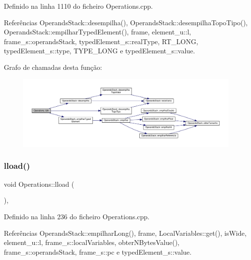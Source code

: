 Definido na linha 1110 do ficheiro Operations.\+cpp.



Referências Operands\+Stack\+::desempilha(), Operands\+Stack\+::desempilha\+Topo\+Tipo(), Operands\+Stack\+::empilhar\+Typed\+Element(), frame, element\+\_\+u\+::l, frame\+\_\+s\+::operands\+Stack, typed\+Element\+\_\+s\+::real\+Type, R\+T\+\_\+\+L\+O\+NG, typed\+Element\+\_\+s\+::type, T\+Y\+P\+E\+\_\+\+L\+O\+NG e typed\+Element\+\_\+s\+::value.

Grafo de chamadas desta função\+:\nopagebreak
\begin{figure}[H]
\begin{center}
\leavevmode
\includegraphics[width=350pt]{classOperations_ab9bb90a9db0433e1d04b0eb9bceea9f4_cgraph}
\end{center}
\end{figure}
\mbox{\label{classOperations_abd9d44b782cc5ae7d7985a424a0985c6}} 
\subsubsection{\texorpdfstring{lload()}{lload()}}
{\footnotesize\ttfamily void Operations\+::lload (\begin{DoxyParamCaption}{ }\end{DoxyParamCaption})\hspace{0.3cm}{\ttfamily [static]}, {\ttfamily [private]}}



Definido na linha 236 do ficheiro Operations.\+cpp.



Referências Operands\+Stack\+::empilhar\+Long(), frame, Local\+Variables\+::get(), is\+Wide, element\+\_\+u\+::l, frame\+\_\+s\+::local\+Variables, obter\+N\+Bytes\+Value(), frame\+\_\+s\+::operands\+Stack, frame\+\_\+s\+::pc e typed\+Element\+\_\+s\+::value.

